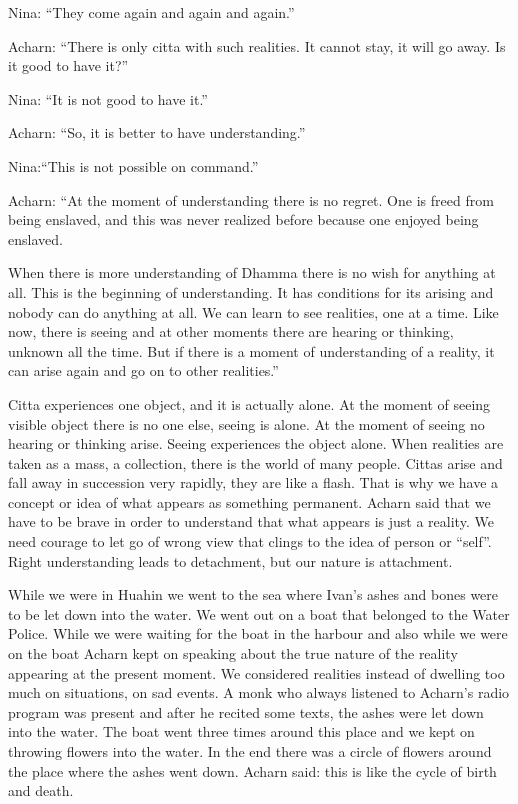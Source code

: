 Nina: ``They come again and again and again.''

Acharn: ``There is only citta with such realities. It cannot stay, it
will go away. Is it good to have it?''

Nina: ``It is not good to have it.''

Acharn: ``So, it is better to have understanding.''

Nina:``This is not possible on command.''

Acharn: ``At the moment of understanding there is no regret. One is
freed from being enslaved, and this was never realized before because
one enjoyed being enslaved.

When there is more understanding of Dhamma there is no wish for anything
at all. This is the beginning of understanding. It has conditions for
its arising and nobody can do anything at all. We can learn to see
realities, one at a time. Like now, there is seeing and at other moments
there are hearing or thinking, unknown all the time. But if there is a
moment of understanding of a reality, it can arise again and go on to
other realities.''

Citta experiences one object, and it is actually alone. At the moment of
seeing visible object there is no one else, seeing is alone. At the
moment of seeing no hearing or thinking arise. Seeing experiences the
object alone. When realities are taken as a mass, a collection, there is
the world of many people. Cittas arise and fall away in succession very
rapidly, they are like a flash. That is why we have a concept or idea of
what appears as something permanent. Acharn said that we have to be
brave in order to understand that what appears is just a reality. We
need courage to let go of wrong view that clings to the idea of person
or ``self''. Right understanding leads to detachment, but our nature is
attachment.

While we were in Huahin we went to the sea where Ivan's ashes and bones
were to be let down into the water. We went out on a boat that belonged
to the Water Police. While we were waiting for the boat in the harbour
and also while we were on the boat Acharn kept on speaking about the
true nature of the reality appearing at the present moment. We
considered realities instead of dwelling too much on situations, on sad
events. A monk who always listened to Acharn's radio program was present
and after he recited some texts, the ashes were let down into the water.
The boat went three times around this place and we kept on throwing
flowers into the water. In the end there was a circle of flowers around
the place where the ashes went down. Acharn said: this is like the cycle
of birth and death.

